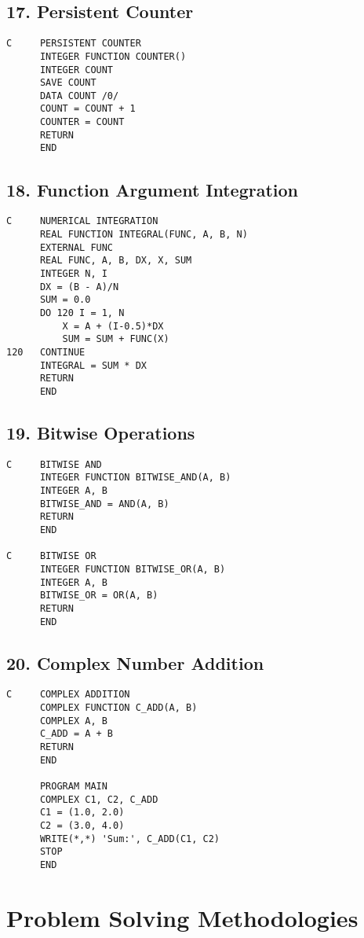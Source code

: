 \documentclass{book}
\begin{document}
\subsection*{17. Persistent Counter}
\begin{verbatim}
C     PERSISTENT COUNTER
      INTEGER FUNCTION COUNTER()
      INTEGER COUNT
      SAVE COUNT
      DATA COUNT /0/
      COUNT = COUNT + 1
      COUNTER = COUNT
      RETURN
      END
\end{verbatim}

\subsection*{18. Function Argument Integration}
\begin{verbatim}
C     NUMERICAL INTEGRATION
      REAL FUNCTION INTEGRAL(FUNC, A, B, N)
      EXTERNAL FUNC
      REAL FUNC, A, B, DX, X, SUM
      INTEGER N, I
      DX = (B - A)/N
      SUM = 0.0
      DO 120 I = 1, N
          X = A + (I-0.5)*DX
          SUM = SUM + FUNC(X)
120   CONTINUE
      INTEGRAL = SUM * DX
      RETURN
      END
\end{verbatim}

\subsection*{19. Bitwise Operations}
\begin{verbatim}
C     BITWISE AND
      INTEGER FUNCTION BITWISE_AND(A, B)
      INTEGER A, B
      BITWISE_AND = AND(A, B)
      RETURN
      END

C     BITWISE OR
      INTEGER FUNCTION BITWISE_OR(A, B)
      INTEGER A, B
      BITWISE_OR = OR(A, B)
      RETURN
      END
\end{verbatim}

\subsection*{20. Complex Number Addition}
\begin{verbatim}
C     COMPLEX ADDITION
      COMPLEX FUNCTION C_ADD(A, B)
      COMPLEX A, B
      C_ADD = A + B
      RETURN
      END

      PROGRAM MAIN
      COMPLEX C1, C2, C_ADD
      C1 = (1.0, 2.0)
      C2 = (3.0, 4.0)
      WRITE(*,*) 'Sum:', C_ADD(C1, C2)
      STOP
      END
\end{verbatim}

\section{Problem Solving Methodologies}
\end{document}
